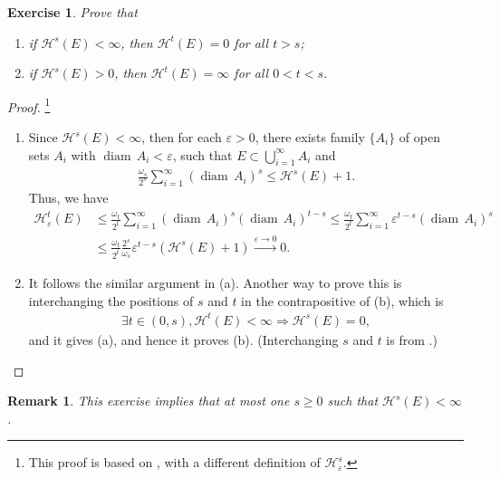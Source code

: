 \documentclass[11pt]{book}
\newtheorem{exercise}{Exercise}[chapter]
\newtheorem{remark}{Remark}[chapter]
\theoremstyle{definition}
\numberwithin{equation}{chapter}
\def\H{{\mathcal H}}
\def\diam{{\operatorname{diam}\,}}
\begin{document}
\begin{exercise}\label{exercise_12}
Prove that
\begin{enumerate}[label=(\alph*)]
    \item if $\mathcal{H}^s(E) < \infty$, then $\mathcal{H}^t(E) = 0$ for all $t > s$;
    
    \item if $\mathcal{H}^s(E) > 0$, then $\mathcal{H}^t(E) = \infty$ for all $0 < t < s$.
\end{enumerate}
\end{exercise}
\begin{proof}\footnote{This proof is based on \cite{12}, with a different definition of $\mathcal{H}^s_{\varepsilon}$.}
~\begin{enumerate}[label=(\alph*)]
    \item Since $\H^s(E) < \infty$, then for each $\varepsilon > 0$, there exists family $\{A_i\}$ of open sets $A_i$ with $\diam A_i < \varepsilon$, such that $E \subset \bigcup^\infty_{i=1} A_i$ and
    \begin{align*}
        \frac{\omega_s}{2^s} \sum^\infty_{i=1} (\diam A_i)^s \leq \H^s(E) + 1.
    \end{align*}
    Thus, we have
    \begin{align*}
        \H^t_{\varepsilon}(E) & \leq \frac{\omega_t}{2^t} \sum^\infty_{i=1} (\diam A_i)^s (\diam A_i)^{t - s} \leq \frac{\omega_t}{2^t} \sum^\infty_{i=1} \varepsilon^{t - s} (\diam A_i)^s \\
        & \leq \frac{\omega_t}{2^t} \frac{2^s}{\omega_s} \varepsilon^{t-s} \left( \H^s(E) + 1\right) \xrightarrow[]{\varepsilon \to 0} 0.
    \end{align*}
    
    \item It follows the similar argument in (a). Another way to prove this is interchanging the positions of $s$ and $t$ in the contrapositive of (b), which is 
    \begin{align*}
        \exists t \in (0,s), \H^t(E) < \infty \Longrightarrow \H^s(E) = 0,
    \end{align*}
    and it gives (a), and hence it proves (b). (Interchanging $s$ and $t$ is from \cite{13}.)
\end{enumerate}
\end{proof}

\medskip

\begin{remark}
This exercise implies that at most one $s \geq 0$ such that $\mathcal{H}^s(E) < \infty$.
\end{remark}
\end{document}
